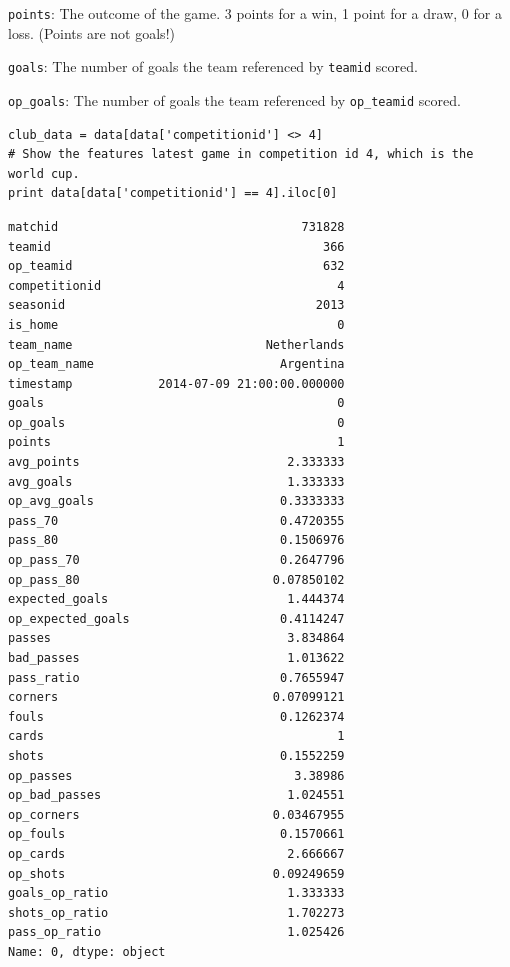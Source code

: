 \documentclass[12pt,fleqn]{article}\usepackage{common}
\begin{document}
\verb!points!: The outcome of the game. 3 points for a win, 1 point for a draw, 0
for a loss. (Points are not goals!)

\verb!goals!: The number of goals the team referenced by \verb!teamid! scored.

\verb!op_goals!: The number of goals the team referenced by
\verb!op_teamid! scored.

\begin{verbatim}
club_data = data[data['competitionid'] <> 4]
# Show the features latest game in competition id 4, which is the world cup.
print data[data['competitionid'] == 4].iloc[0]
\end{verbatim}

\begin{verbatim}
matchid                                  731828
teamid                                      366
op_teamid                                   632
competitionid                                 4
seasonid                                   2013
is_home                                       0
team_name                           Netherlands
op_team_name                          Argentina
timestamp            2014-07-09 21:00:00.000000
goals                                         0
op_goals                                      0
points                                        1
avg_points                             2.333333
avg_goals                              1.333333
op_avg_goals                          0.3333333
pass_70                               0.4720355
pass_80                               0.1506976
op_pass_70                            0.2647796
op_pass_80                           0.07850102
expected_goals                         1.444374
op_expected_goals                     0.4114247
passes                                 3.834864
bad_passes                             1.013622
pass_ratio                            0.7655947
corners                              0.07099121
fouls                                 0.1262374
cards                                         1
shots                                 0.1552259
op_passes                               3.38986
op_bad_passes                          1.024551
op_corners                           0.03467955
op_fouls                              0.1570661
op_cards                               2.666667
op_shots                             0.09249659
goals_op_ratio                         1.333333
shots_op_ratio                         1.702273
pass_op_ratio                          1.025426
Name: 0, dtype: object
\end{verbatim}
\end{document}
